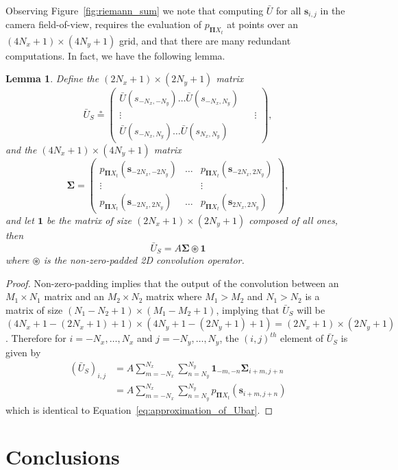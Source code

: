 \documentclass{article}
\newtheorem{lemma}[theorem]{Lemma}
\newcommand{\defeq}{\circeq}
\newcommand{\sbf}{\mathbf{s}}
\newcommand{\onebf}{\mathbf{1}}
\newcommand{\Pibf}{\boldsymbol{\Pi}}
\newcommand{\Sigmabf}{\boldsymbol{\Sigma}}
\begin{document}
Observing Figure~\ref{fig:riemann_sum} we note that computing $\bar{U}$ for all $\sbf_{i,j}$ in the camera field-of-view, requires the evaluation of $p_{\Pibf X_t}$ at points over an $(4N_x+1)\times(4N_y+1)$ grid, and that there are many redundant computations.  In fact, we have the following lemma.
\begin{lemma}
	Define the $(2N_x+1)\times(2N_y+1)$ matrix
	\[
	\bar{U}_S \defeq \begin{pmatrix}
						 \bar{U}(s_{-N_x,-N_y}) \dots \bar{U}(s_{-N_x,N_y}) \\
						 \vdots & & \vdots \\
						 \bar{U}(s_{-N_x,N_y}) \dots \bar{U}(s_{N_x,N_y})
                      \end{pmatrix},
	\]
	and the $(4N_x+1)\times(4N_y+1)$ matrix
	\[
		\Sigmabf = \begin{pmatrix}  p_{\Pibf X_t}(\sbf_{-2N_x,-2N_y}) & \dots & p_{\Pibf X_t}(\sbf_{-2N_x,2N_y}) \\
                                    \vdots & & \vdots \\	
                                    p_{\Pibf X_t}(\sbf_{-2N_x,2N_y}) & \dots & p_{\Pibf X_t}(\sbf_{2N_x,2N_y})
                   \end{pmatrix},
	\]
	and let $\onebf$ be the matrix of size $(2N_x+1)\times(2N_y+1)$ composed of all ones, then
	\[
	\bar{U}_S = A \Sigmabf \circledast \onebf
	\]
	where $\circledast$ is the non-zero-padded 2D convolution operator.
\end{lemma}
\begin{proof}
Non-zero-padding implies that the output of the convolution 	between an $M_1\times N_1$ matrix and an $M_2\times N_2$ matrix where $M_1>M_2$ and $N_1>N_2$ is a matrix of size $(N_1-N_2+1)\times(M_1-M_2+1)$, implying that $\bar{U}_S$ will be $(4N_x+1-(2N_x+1)+1)\times(4N_y+1-(2N_y+1)+1) = (2N_x+1)\times(2N_y+1)$.  Therefore for $i=-N_x,\dots,N_x$ and $j=-N_y,\dots,N_y$, the $(i,j)^{th}$ element of $\bar{U}_S$ is given by
	\begin{align*}
	(\bar{U}_S)_{i,j} &= A \sum_{m=-N_x}^{N_x} \sum_{n=N_y}^{N_y} \onebf_{-m,-n} \Sigmabf_{i+m, j+n} \\
	                  &= A \sum_{m=-N_x}^{N_x} \sum_{n=N_y}^{N_y} p_{\Pibf X_t}(\sbf_{i+m, j+n})
	\end{align*}
	which is identical to Equation~\eqref{eq:approximation_of_Ubar}.
\end{proof}




   
\section{Conclusions}
\label{sec:conclusion}




\end{document}
